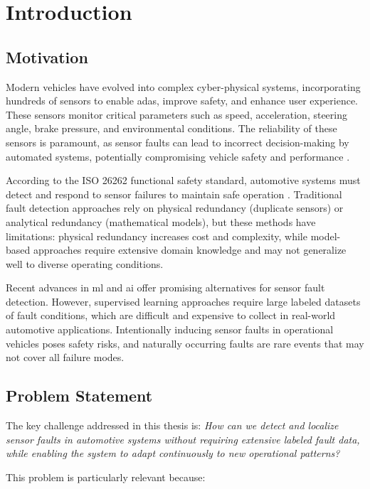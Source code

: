 \chapter{Introduction}
\label{chap:introduction}

\section{Motivation}

Modern vehicles have evolved into complex cyber-physical systems, incorporating hundreds of sensors to enable \gls{adas}, improve safety, and enhance user experience. These sensors monitor critical parameters such as speed, acceleration, steering angle, brake pressure, and environmental conditions. The reliability of these sensors is paramount, as sensor faults can lead to incorrect decision-making by automated systems, potentially compromising vehicle safety and performance \parencite{iso26262_2018}.

According to the ISO 26262 functional safety standard, automotive systems must detect and respond to sensor failures to maintain safe operation \parencite{iso26262_2018}. Traditional fault detection approaches rely on physical redundancy (duplicate sensors) or analytical redundancy (mathematical models), but these methods have limitations: physical redundancy increases cost and complexity, while model-based approaches require extensive domain knowledge and may not generalize well to diverse operating conditions.

Recent advances in \gls{ml} and \gls{ai} offer promising alternatives for sensor fault detection. However, supervised learning approaches require large labeled datasets of fault conditions, which are difficult and expensive to collect in real-world automotive applications. Intentionally inducing sensor faults in operational vehicles poses safety risks, and naturally occurring faults are rare events that may not cover all failure modes.

\section{Problem Statement}

The key challenge addressed in this thesis is: \textit{How can we detect and localize sensor faults in automotive systems without requiring extensive labeled fault data, while enabling the system to adapt continuously to new operational patterns?}

This problem is particularly relevant because:

